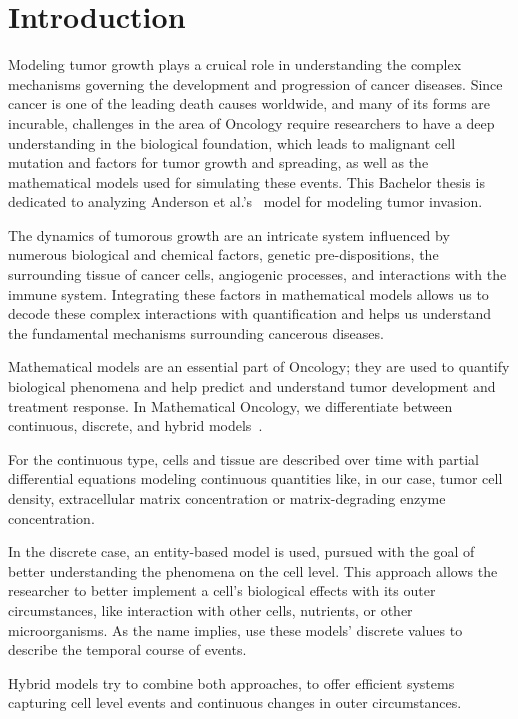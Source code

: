 \section{Introduction}
Modeling tumor growth plays a cruical role in understanding the complex mechanisms governing the development and progression of cancer diseases. Since cancer is one of the leading death causes worldwide, and many of its forms are incurable, challenges in the area of Oncology require researchers to have a deep understanding in the biological foundation, which leads to malignant cell mutation and factors for tumor growth and spreading, as well as the mathematical models used for simulating these events. This Bachelor thesis is dedicated to analyzing Anderson et al.'s~\cite{anderson_continuous_1998,anderson_mathematical_2000} model for modeling tumor invasion.

The dynamics of tumorous growth are an intricate system influenced by numerous biological and chemical factors, genetic pre-dispositions, the surrounding tissue of cancer cells, angiogenic processes, and interactions with the immune system. Integrating these factors in mathematical models allows us to decode these complex interactions with quantification and helps us understand the fundamental mechanisms surrounding cancerous diseases.

Mathematical models are an essential part of Oncology; they are used to quantify biological phenomena and help predict and understand tumor development and treatment response. In Mathematical Oncology, we differentiate between continuous, discrete, and hybrid models~\cite{BEKISZ2020101198}. 

For the continuous type, cells and tissue are described over time with partial differential equations modeling continuous quantities like, in our case, tumor cell density, extracellular matrix concentration or matrix-degrading enzyme concentration.

In the discrete case, an entity-based model is used, pursued with the goal of better understanding the phenomena on the cell level. This approach allows the researcher to better implement a cell's biological effects with its outer circumstances, like interaction with other cells, nutrients, or other microorganisms. As the name implies, use these models' discrete values to describe the temporal course of events.

Hybrid models try to combine both approaches, to offer efficient systems capturing cell level events and continuous changes in outer circumstances.

